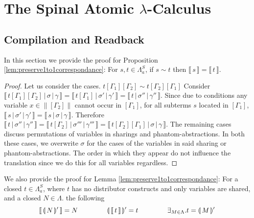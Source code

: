 \documentclass[a4paper,UKenglish,cleveref, autoref]{lipics-v2019}
\newcommand{\FALC}{\Lambda^{S}_{a}}
\newcommand{\readback}[2]{\llbracket \, #1 \, \rrbracket}
\newcommand{\compile}[1]{\llparenthesis \, #1 \, \rrparenthesis}
\newcommand{\trans}[1]{\llbracket \, #1 \, \rrbracket}
\newcommand{\readbackwmap}[3]{\llbracket \, #1 \, \vert \, #2 \, \vert \, #3  \, \rrbracket }
\newcommand{\bindvars}[1]{\parallel#1\parallel}
\begin{document}


\newpage

\appendix

\section{The Spinal Atomic $\lambda$-Calculus}

\subsection{Compilation and Readback}

In this section we provide the proof for Proposition \ref{lem:preserve1to1correspondance}: For $s, t \in \FALC$, if $s \sim t$ then $\trans{s} = \trans{t}$.

\begin{proof}
Let us consider the cases.
\newline
\newline
$t[\Gamma_{1}][\Gamma_{2}] \sim t[\Gamma_{2}][\Gamma_{1}]$
\newline
Consider $\readbackwmap{t[\Gamma_{1}][\Gamma_{2}]}{\sigma}{\gamma} = \readbackwmap{t[\Gamma_{1}]}{\sigma'}{\gamma'} = \readbackwmap{t}{\sigma''}{\gamma''}$. Since due to conditions any variable $x \in \bindvars{[\Gamma_{2}]}$ cannot occur in $[\Gamma_{1}]$, for all subterms $s$ located in $[\Gamma_{1}]$, $\readbackwmap{s}{\sigma'}{\gamma'} = \readbackwmap{s}{\sigma}{\gamma}$. Therefore $\readbackwmap{t}{\sigma''}{\gamma''} = \readbackwmap{t[\Gamma_{2}]}{\sigma'''}{\gamma'''} = \readbackwmap{t[\Gamma_{2}][\Gamma_{1}]}{\sigma}{\gamma}$.
\newline
\newline
The remaining cases discuss permutations of variables in sharings and phantom-abstractions. In both these cases, we overwrite $\sigma$ for the cases of the variables in said sharing or phantom-abstractions. The order in which they appear do not influence the translation since we do this for all variables regardless.
\end{proof}

We also provide the proof for Lemma \ref{lem:preserve1to1correspondance}: For a closed $t \in \FALC$, where $t$ has no distributor constructs and only variables are shared, and a closed $N \in \Lambda$. the following
$$\readback{\compile{N}'}{I} = N \hspace{1.5cm} \compile{\readback{t}{I}}' = t \hspace{1.5cm} \exists_{ M \in \Lambda} . t = \compile{M}'$$
\end{document}
